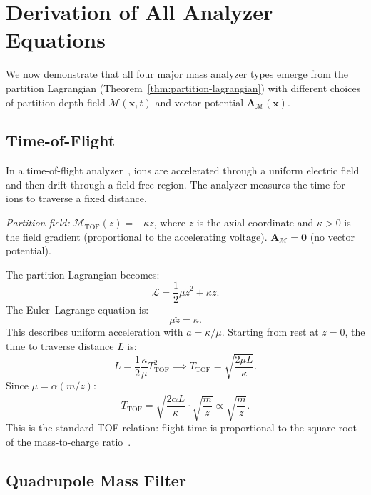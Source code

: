 \documentclass[11pt,twocolumn,a4paper]{article}
\theoremstyle{definition}
\theoremstyle{remark}
\newcommand{\Depth}{\mathcal{M}}
\newcommand{\partinert}{\mu}
\newcommand{\Apartition}{\mathbf{A}_{\mathcal{M}}}
\newcommand{\Lagr}{\mathcal{L}}
\begin{document}
\section{Derivation of All Analyzer Equations}
\label{sec:analyzers}

We now demonstrate that all four major mass analyzer types emerge from the partition Lagrangian (Theorem~\ref{thm:partition-lagrangian}) with different choices of partition depth field $\Depth(\mathbf{x}, t)$ and vector potential $\Apartition(\mathbf{x})$.

\subsection{Time-of-Flight}
\label{sec:tof}

In a time-of-flight analyzer~\citep{wiley1955}, ions are accelerated through a uniform electric field and then drift through a field-free region. The analyzer measures the time for ions to traverse a fixed distance.

\emph{Partition field:} $\Depth_{\mathrm{TOF}}(z) = -\kappa z$, where $z$ is the axial coordinate and $\kappa > 0$ is the field gradient (proportional to the accelerating voltage). $\Apartition = \mathbf{0}$ (no vector potential).

The partition Lagrangian becomes:
\[
  \Lagr = \frac{1}{2}\partinert \dot{z}^2 + \kappa z.
\]
The Euler--Lagrange equation is:
\[
  \partinert \ddot{z} = \kappa.
\]
This describes uniform acceleration with $a = \kappa/\partinert$. Starting from rest at $z=0$, the time to traverse distance $L$ is:
\[
  L = \frac{1}{2}\frac{\kappa}{\partinert}T_{\mathrm{TOF}}^2 \implies T_{\mathrm{TOF}} = \sqrt{\frac{2\partinert L}{\kappa}}.
\]
Since $\partinert = \alpha(m/z)$:
\begin{equation}
\label{eq:tof}
  \boxed{T_{\mathrm{TOF}} = \sqrt{\frac{2\alpha L}{\kappa}} \cdot \sqrt{\frac{m}{z}} \propto \sqrt{\frac{m}{z}}}.
\end{equation}
This is the standard TOF relation: flight time is proportional to the square root of the mass-to-charge ratio~\citep{wiley1955, gross2017}.

\subsection{Quadrupole Mass Filter}
\label{sec:quadrupole}
\end{document}

